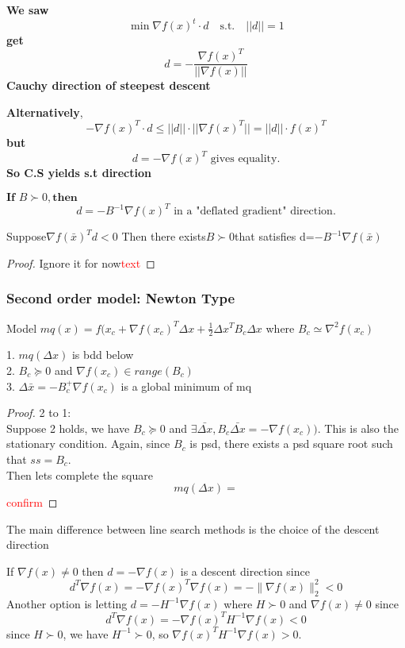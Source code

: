 \begin{problem}
  \textbf{We saw}
  \[
  \min \nabla f(x)^t \cdot d \quad \text{s.t.} \quad ||d|| = 1
  \]
  \textbf{get} 
  \[
  d = -\frac{\nabla f(x)^T}{||\nabla f(x)||}
  \]
  \textbf{Cauchy direction of steepest descent}
  
  \textbf{Alternatively},
  \[
  -\nabla f(x)^T \cdot d \leq ||d|| \cdot ||\nabla f(x)^T|| = ||d|| \cdot f(x)^T
  \]
  \textbf{but} 
  \[
  d = -\nabla f(x)^T \text{ gives equality.}
  \]
  \textbf{So C.S yields s.t direction}
  
  $\textbf{If } B \succ 0, \textbf{then} $
  \[
  d = -B^{-1} \nabla f(x)^T \text{ in a "deflated gradient" direction.}
  \]
  
  
\end{problem}
\begin{proposition}[Existence of B]
  Suppose$\nabla f(\bar{x})^T d <0$ Then there exists$B\succ0$that satisfies d=$-B^{-1}\nabla f(\bar{x})$
\end{proposition}
\begin{proof}
  Ignore it for now\textcolor{red}{text}
\end{proof}

\subsubsection{Second order model: Newton Type}
Model $mq(x)=f(x_c+\nabla f(x_c)^T\Delta x+\frac{1}{2}\Delta x^TB_c \Delta x$ 
where $B_c\simeq \nabla^2f(x_c)$

\begin{lemma}[TFAE]
  1. $mq(\Delta x)$ is bdd below
  \\2. $B_c \succeq 0$ and $\nabla f(x_c)\in range(B_c)$
  \\3. $\Delta \bar{x}=-B_c^+\nabla f(x_c)$ is a global minimum of mq
\end{lemma}
\begin{proof}
  2 to 1:
  \\ Suppose 2 holds, we have $B_c \succeq 0$ and $\exists \bar{\Delta x},B_c\bar{\Delta x}=-\nabla f(x_c))$.
  This is also the stationary condition. Again, since $B_c$ is psd, there exists a psd square root such that $ss=B_c$.
  \\ Then lets complete the square $$mq(\Delta x)=$$ \textcolor{red}{confirm}

\end{proof}
The main difference between line search methods is the choice of the descent direction
\begin{problem}[Example]
  If $\nabla f(x) \neq 0$ then $d = - \nabla f(x)$ is a descent direction since
  $$d^T \nabla f(x) = -\nabla f(x)^T \nabla f(x) = - \|\nabla f(x) \|^2_2 < 0$$
  Another option is letting $d = -H^{-1} \nabla f(x)$ where $H \succ 0$ and $\nabla f(x) \neq 0$ since
  $$d^T \nabla f(x) = - \nabla f(x)^T H^{-1} \nabla f(x) < 0$$
  since $H \succ 0$, we have $H^{-1} \succ 0$, so $\nabla f(x)^T H^{-1} \nabla f(x) > 0$.
\end{problem}

